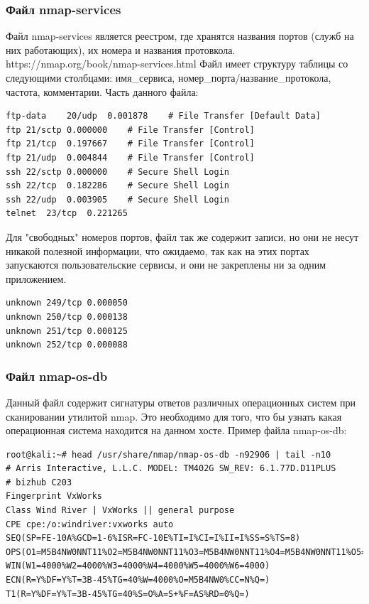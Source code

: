 \documentclass[10pt,a4paper]{report}
\begin{document}
		\subsubsection{Файл nmap-services}
		Файл nmap-services является реестром, где хранятся названия портов (служб на них работающих), их номера и названия протовкола. https://nmap.org/book/nmap-services.html
Файл имеет структуру таблицы со следующими столбцами: имя\_сервиса, номер\_порта/название\_протокола, частота, комментарии.
			Часть данного файла:
			\begin{verbatim}
ftp-data	20/udp	0.001878	# File Transfer [Default Data]
ftp	21/sctp	0.000000	# File Transfer [Control]
ftp	21/tcp	0.197667	# File Transfer [Control]
ftp	21/udp	0.004844	# File Transfer [Control]
ssh	22/sctp	0.000000	# Secure Shell Login
ssh	22/tcp	0.182286	# Secure Shell Login
ssh	22/udp	0.003905	# Secure Shell Login
telnet	23/tcp	0.221265
			\end{verbatim}
			
			Для "свободных" номеров портов, файл так же содержит записи, но они не несут никакой полезной информации, что ожидаемо, так как на этих портах запускаются пользовательские сервисы, и они не закреплены ни за одним приложением.
			\begin{verbatim}
unknown	249/tcp	0.000050
unknown	250/tcp	0.000138
unknown	251/tcp	0.000125
unknown	252/tcp	0.000088
			\end{verbatim}
			
			
		\subsubsection{Файл nmap-os-db}
			Данный файл содержит сигнатуры ответов различных операционных систем при сканировании утилитой nmap. Это необходимо для того, что бы узнать какая операционная система находится на данном хосте. Пример файла nmap-os-db:
			\begin{verbatim}
root@kali:~# head /usr/share/nmap/nmap-os-db -n92906 | tail -n10
# Arris Interactive, L.L.C. MODEL: TM402G SW_REV: 6.1.77D.D11PLUS
# bizhub C203
Fingerprint VxWorks
Class Wind River | VxWorks || general purpose
CPE cpe:/o:windriver:vxworks auto
SEQ(SP=FE-10A%GCD=1-6%ISR=FC-10E%TI=I%CI=I%II=I%SS=S%TS=8)
OPS(O1=M5B4NW0NNT11%O2=M5B4NW0NNT11%O3=M5B4NW0NNT11%O4=M5B4NW0NNT11%O5=M5B4NW0NNT11%O6=M5B4NNT11)
WIN(W1=4000%W2=4000%W3=4000%W4=4000%W5=4000%W6=4000)
ECN(R=Y%DF=Y%T=3B-45%TG=40%W=4000%O=M5B4NW0%CC=N%Q=)
T1(R=Y%DF=Y%T=3B-45%TG=40%S=O%A=S+%F=AS%RD=0%Q=)
			\end{verbatim}
\end{document}
